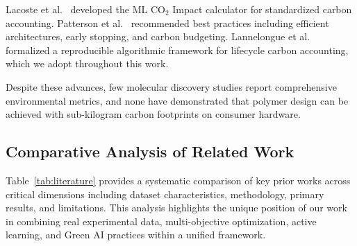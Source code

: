 \documentclass[twocolumn,10pt]{article}
\begin{document}
Lacoste et al.~\cite{lacoste2019quantifying} developed the ML CO$_2$ Impact calculator for standardized carbon accounting. Patterson et al.~\cite{patterson2021carbon} recommended best practices including efficient architectures, early stopping, and carbon budgeting. Lannelongue et al.~\cite{lannelongue2021green} formalized a reproducible algorithmic framework for lifecycle carbon accounting, which we adopt throughout this work.

Despite these advances, few molecular discovery studies report comprehensive environmental metrics, and none have demonstrated that polymer design can be achieved with sub-kilogram carbon footprints on consumer hardware.


\subsection{Comparative Analysis of Related Work}

Table~\ref{tab:literature} provides a systematic comparison of key prior works across critical dimensions including dataset characteristics, methodology, primary results, and limitations. This analysis highlights the unique position of our work in combining real experimental data, multi-objective optimization, active learning, and Green AI practices within a unified framework.
\end{document}
